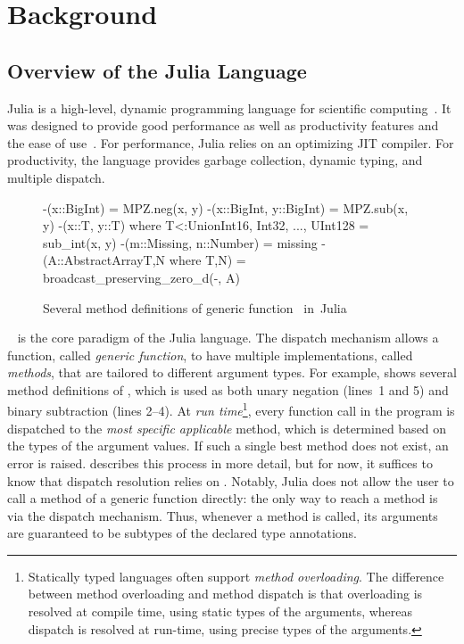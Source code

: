 \chapter{Background}

\section{Overview of the Julia Language}

Julia is a high-level, dynamic programming language for scientific computing~\cite{TODO}.
It was designed to provide good performance as well as productivity features and
the ease of use~\cite{TODO}.
For performance, Julia relies on an optimizing JIT compiler.
For productivity, the language provides garbage collection, dynamic typing, and
multiple dispatch. 

\begin{figure}[t]
\begin{julia}
-(x::BigInt) = MPZ.neg(x, y)
-(x::BigInt, y::BigInt) = MPZ.sub(x, y)
-(x::T, y::T) where T<:Union{Int16, Int32, ..., UInt128} = sub_int(x, y)
-(m::Missing, n::Number) = missing
-(A::AbstractArray{T,N} where {T,N}) = broadcast_preserving_zero_d(-, A)
\end{julia}
\caption{Several method definitions of generic function~\cjl{(-)}
in~Julia}\label{fig:code:subtraction}
\end{figure}

~\cite{TODO} is the core paradigm of the Julia
language. The dispatch mechanism allows a function, called \emph{generic
function}, to have multiple implementations, called \emph{methods}, that are
tailored to different argument types. For example, 
shows several method definitions of \cjl{(-)}, which is used as both unary
negation (lines~1 and 5) and binary subtraction (lines 2--4).
At \emph{run time}\footnote{Statically typed languages often support
\emph{method overloading}. The difference between method overloading and method
dispatch is that overloading is resolved at compile time, using static types of
the arguments, whereas dispatch is resolved at run-time, using precise types
of the arguments.},
every function call in the program is dispatched to the
\emph{most specific applicable} method, which is determined based on the
types of the argument values. If such a single best method does not exist,
an error is raised.
 describes this process in more detail, but for now,
it suffices to know that dispatch resolution relies on .
Notably, Julia does not allow the user to call a method of a generic function
directly: the only way to reach a method is via the dispatch mechanism.
Thus, whenever a method is called, its arguments are guaranteed to be
subtypes of the declared type annotations.

